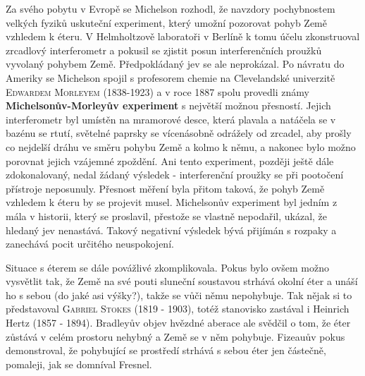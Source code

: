       Za svého pobytu v Evropě se Michelson rozhodl, že navzdory pochybnostem velkých fyziků
      uskuteční experiment, který umožní pozorovat pohyb Země vzhledem k éteru. V Helmholtzově
      laboratoři v Berlíně k tomu účelu zkonstruoval zrcadlový interferometr a pokusil se zjistit
      posun interferenčních proužků vyvolaný pohybem Země. Předpokládaný jev se ale neprokázal. Po
      návratu do Ameriky se Michelson spojil s profesorem chemie na Clevelandské univerzitě
      \textsc{Edwardem Morleyem} (1838-1923) a v roce 1887 spolu provedli známy
      \textbf{Michelsonův-Morleyův experiment} s největší možnou přesností. Jejich interferometr byl
      umístěn na mramorové desce, která plavala a natáčela se v bazénu se rtutí, světelné paprsky se
      vícenásobně odrážely od zrcadel, aby prošly co nejdelší dráhu ve směru pohybu Země a kolmo k
      němu, a nakonec bylo možno porovnat jejich vzájemné zpoždění. Ani tento experiment, později
      ještě dále zdokonalovaný, nedal žádaný výsledek - interferenční proužky se při pootočení
      přístroje neposunuly. Přesnost měření byla přitom taková, že pohyb Země vzhledem k éteru by se
      projevit musel. Michelsonův experiment byl jedním z mála v historii, který se proslavil,
      přestože se vlastně nepodařil, ukázal, že hledaný jev nenastává. Takový negativní výsledek
      bývá přijímán s rozpaky a zanechává pocit určitého neuspokojení.

      Situace s éterem se dále povážlivé zkomplikovala. Pokus bylo ovšem možno vysvětlit tak, že
      Země na své pouti sluneční soustavou strhává okolní éter a unáší ho s sebou (do jaké asi
      výšky?), takže se vůči němu nepohybuje. Tak nějak si to představoval \textsc{Gabriel Stokes}
      (1819 - 1903), totéž stanovisko zastával i Heinrich Hertz (1857 - 1894). Bradleyův objev
      hvězdné aberace ale svědčil o tom, že éter zůstává v celém prostoru nehybný a Země se v něm
      pohybuje. Fizeauův pokus demonstroval, že pohybující se prostředí strhává s sebou éter jen
      částečně, pomaleji, jak se domníval Fresnel.


